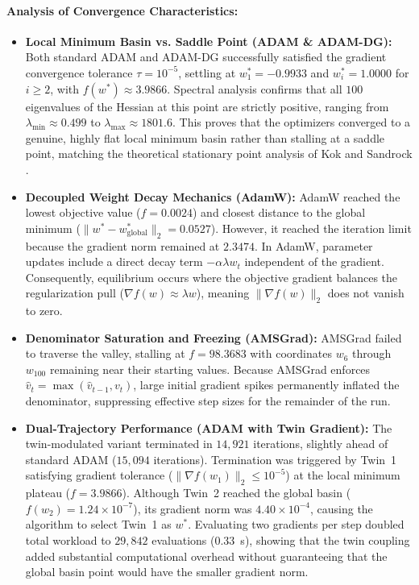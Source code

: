 \documentclass[11pt,a4paper]{article}
\newcommand{\added}[1]{#1}
\begin{document}
\added{\paragraph{Analysis of Convergence Characteristics:}
\begin{itemize}
    \item \textbf{Local Minimum Basin vs. Saddle Point (ADAM \& ADAM-DG):} Both standard ADAM and ADAM-DG successfully satisfied the gradient convergence tolerance $\tau = 10^{-5}$, settling at $w_1^* = -0.9933$ and $w_i^* = 1.0000$ for $i \ge 2$, with $f(w^*) \approx 3.9866$. Spectral analysis confirms that all $100$ eigenvalues of the Hessian at this point are strictly positive, ranging from $\lambda_{\min} \approx 0.499$ to $\lambda_{\max} \approx 1801.6$. This proves that the optimizers converged to a genuine, highly flat local minimum basin rather than stalling at a saddle point, matching the theoretical stationary point analysis of Kok and Sandrock \cite{kok2009locating}.
    \item \textbf{Decoupled Weight Decay Mechanics (AdamW):} AdamW \cite{loshchilov2017decoupled} reached the lowest objective value ($f = 0.0024$) and closest distance to the global minimum ($\|w^* - w^*_{\text{global}}\|_2 = 0.0527$). However, it reached the iteration limit because the gradient norm remained at $2.3474$. In AdamW, parameter updates include a direct decay term $-\alpha \lambda w_t$ independent of the gradient. Consequently, equilibrium occurs where the objective gradient balances the regularization pull ($\nabla f(w) \approx \lambda w$), meaning $\|\nabla f(w)\|_2$ does not vanish to zero.
    \item \textbf{Denominator Saturation and Freezing (AMSGrad):} AMSGrad \cite{reddi2018convergence} failed to traverse the valley, stalling at $f = 98.3683$ with coordinates $w_6$ through $w_{100}$ remaining near their starting values. Because AMSGrad enforces $\hat{v}_t = \max(\hat{v}_{t-1}, v_t)$, large initial gradient spikes permanently inflated the denominator, suppressing effective step sizes for the remainder of the run.
    \item \textbf{Dual-Trajectory Performance (ADAM with Twin Gradient):} The twin-modulated variant terminated in $14{,}921$ iterations, slightly ahead of standard ADAM ($15{,}094$ iterations). Termination was triggered by Twin~1 satisfying gradient tolerance ($\|\nabla f(w_1)\|_2 \le 10^{-5}$) at the local minimum plateau ($f = 3.9866$). Although Twin~2 reached the global basin ($f(w_2) = 1.24 \times 10^{-7}$), its gradient norm was $4.40 \times 10^{-4}$, causing the algorithm to select Twin~1 as $w^*$. Evaluating two gradients per step doubled total workload to $29{,}842$ evaluations ($0.33$~s), showing that the twin coupling added substantial computational overhead without guaranteeing that the global basin point would have the smaller gradient norm.
\end{itemize}}
\end{document}
